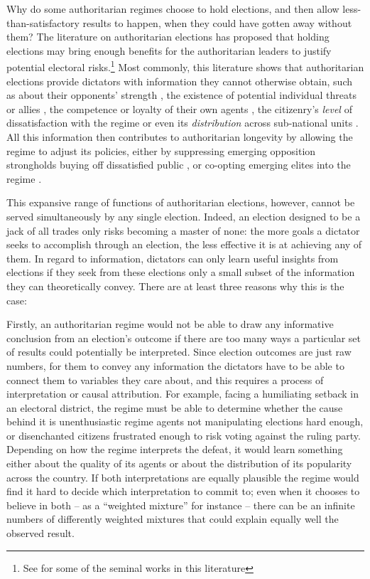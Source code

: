 \documentclass[12pt]{article}
\newcommand{\1}{\mathbbm{1}}
\begin{document}
Why do some authoritarian regimes choose to hold elections, and then allow less-than-satisfactory results to happen, when they could have gotten away without them? The literature on authoritarian elections has proposed that holding elections may bring enough benefits for the authoritarian leaders to justify potential electoral risks.\footnote{See \citet{Geddes2005, LustOkar2006, AR2005, Magaloni2006, Blaydes2008, Miller2015, Cox2009} for some of the seminal works in this literature} Most commonly, this literature shows that authoritarian elections provide dictators with information they cannot otherwise obtain, such as about their opponents' strength \citep{Geddes2005}, the existence of potential individual threats or allies \citep{LustOkar2005}, the competence or loyalty of their own agents \citep{Magaloni2006, Blaydes2008, Myagkov2009, RundlettSvolik2016}, the citizenry's \textit{level} of dissatisfaction with the regime \citep{Miller2015} or even its \textit{distribution} across sub-national units \citep{Magaloni2006, Blaydes2008, Reed2001}. All this information then contributes to authoritarian longevity by allowing the regime to adjust its policies, either by suppressing emerging opposition strongholds \citep{Magaloni2006, Blaydes2008} buying off dissatisfied public \citep{Reed2001, Miller2015, Magaloni2006}, or co-opting emerging elites into the regime \citep{LustOkar2005}.

This expansive range of functions of authoritarian elections, however, cannot be served simultaneously by any single election. Indeed, an election designed to be a jack of all trades only risks becoming a master of none: the more goals a dictator seeks to accomplish through an election, the less effective it is at achieving any of them. In regard to information, dictators can only learn useful insights from elections if they seek from these elections only a small subset of the information they can theoretically convey. There are at least three reasons why this is the case:

Firstly, an authoritarian regime would not be able to draw any informative conclusion from an election's outcome if there are too many ways a particular set of results could potentially be interpreted. Since election outcomes are just raw numbers, for them to convey any information the dictators have to be able to connect them to variables they care about, and this requires a process of interpretation or causal attribution. For example, facing a humiliating setback in an electoral district, the regime must be able to determine whether the cause behind it is unenthusiastic regime agents not manipulating elections hard enough, or disenchanted citizens frustrated enough to risk voting against the ruling party. Depending on how the regime interprets the defeat, it would learn something either about the quality of its agents or about the distribution of its popularity across the country. If both interpretations are equally plausible the regime would find it hard to decide which interpretation to commit to; even when it chooses to believe in both -- as a ``weighted mixture'' for instance -- there can be an infinite numbers of differently weighted mixtures that could explain equally well the observed result. 
\end{document}
